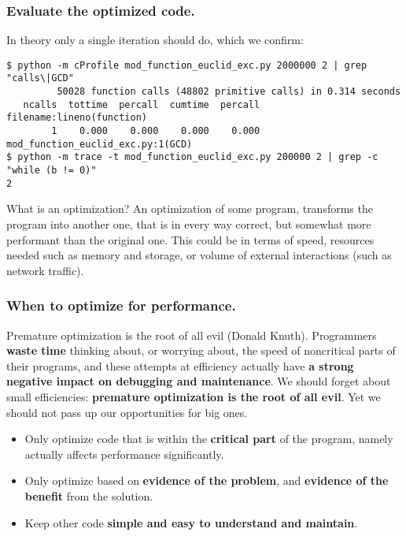 \documentclass{beamer} %
\newcommand\emc[1]{\textcolor{brightblue}{\textbf{#1}}}
\begin{document}

\begin{frame}[fragile]
\frametitle{Evaluate the optimized code.}

In theory only a single iteration should do, which we confirm:
\begin{Verbatim}[fontsize=\scriptsize]
$ python -m cProfile mod_function_euclid_exc.py 2000000 2 | grep "calls\|GCD"
         50028 function calls (48802 primitive calls) in 0.314 seconds
   ncalls  tottime  percall  cumtime  percall filename:lineno(function)
        1    0.000    0.000    0.000    0.000 mod_function_euclid_exc.py:1(GCD)
$ python -m trace -t mod_function_euclid_exc.py 200000 2 | grep -c "while (b != 0)"
2
\end{Verbatim}

\begin{block}{What is an optimization?}
An optimization of some program, transforms the program into another one, that is in every way correct, but somewhat more performant than the original one. This could be in terms of speed, resources needed such as memory and storage, or volume of external interactions (such as network traffic).
\end{block}

\end{frame}


\begin{frame}
\frametitle{When to optimize for performance.}

\begin{block}{Premature optimization is the root of all evil (Donald Knuth).}
\footnotesize
Programmers \emc{waste time} thinking about, or worrying about, the speed of noncritical parts of their programs, and these attempts at efficiency actually have \emc{a strong negative impact on debugging and maintenance}. We should forget about small efficiencies: \emc{premature optimization is the root of all evil}. Yet we should not pass up our opportunities for big ones.
\end{block}

\begin{itemize}
\item Only optimize code that is within the \emc{critical part} of the program, namely actually affects performance significantly.
\item Only optimize based on \emc{evidence of the problem}, and \emc{evidence of the benefit} from the solution.
\item Keep other code \emc{simple and easy to understand and maintain}.
\end{itemize}

\end{frame}
\end{document}

